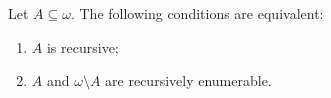 Let $A \subseteq \omega$. The following conditions are equivalent:

\begin{enumerate}
\item[(i)] $A$ is recursive;
\item[(ii)] $A$ and $\omega \setminus A$ are recursively enumerable.
\end{enumerate}

